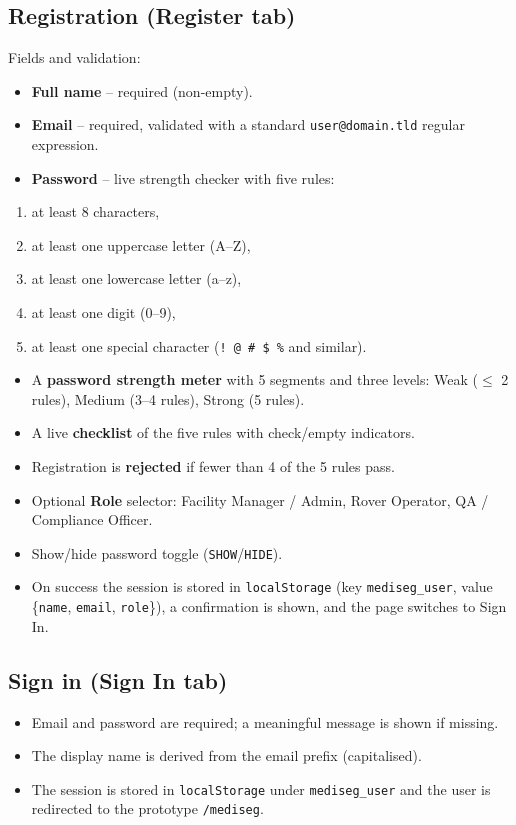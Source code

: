 \documentclass[11pt, a4paper]{article}
\begin{document}
\subsection{Registration (Register tab)}
Fields and validation:
\begin{itemize}[leftmargin=1.6em, itemsep=2pt]
  \item \textbf{Full name} -- required (non-empty).
  \item \textbf{Email} -- required, validated with a standard
        \texttt{user@domain.tld} regular expression.
  \item \textbf{Password} -- live strength checker with five rules:
\end{itemize}
\begin{enumerate}[leftmargin=1.6em, itemsep=2pt]
  \item at least 8 characters,
  \item at least one uppercase letter (A--Z),
  \item at least one lowercase letter (a--z),
  \item at least one digit (0--9),
  \item at least one special character (\texttt{! @ \# \$ \%} and similar).
\end{enumerate}
\begin{itemize}[leftmargin=1.6em, itemsep=2pt]
  \item A \textbf{password strength meter} with 5 segments and three levels:
        Weak ($\leq$ 2 rules), Medium (3--4 rules), Strong (5 rules).
  \item A live \textbf{checklist} of the five rules with check/empty indicators.
  \item Registration is \textbf{rejected} if fewer than 4 of the 5 rules pass.
  \item Optional \textbf{Role} selector: Facility Manager / Admin, Rover
        Operator, QA / Compliance Officer.
  \item Show/hide password toggle (\texttt{SHOW}/\texttt{HIDE}).
  \item On success the session is stored in \texttt{localStorage}
        (key \texttt{mediseg\_user}, value \{\texttt{name}, \texttt{email},
        \texttt{role}\}), a confirmation is shown, and the page switches to
        Sign In.
\end{itemize}

\subsection{Sign in (Sign In tab)}
\begin{itemize}[leftmargin=1.6em, itemsep=2pt]
  \item Email and password are required; a meaningful message is shown if
        missing.
  \item The display name is derived from the email prefix (capitalised).
  \item The session is stored in \texttt{localStorage} under
        \texttt{mediseg\_user} and the user is redirected to the prototype
        \texttt{/mediseg}.
\end{itemize}
\end{document}
